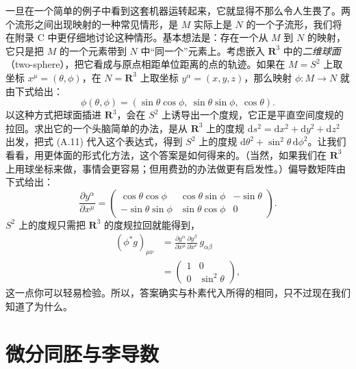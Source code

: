 一旦在一个简单的例子中看到这套机器运转起来，它就显得不那么令人生畏了。两个流形之间出现映射的一种常见情形，是 $M$ 实际上是 $N$ 的一个子流形，我们将在附录 C 中更仔细地讨论这种情形。基本想法是：存在一个从 $M$ 到 $N$ 的映射，它只是把 $M$ 的一个元素带到 $N$ 中“同一个”元素上。考虑嵌入 $\mathbf{R}^{3}$ 中的\emph{二维球面}（two-sphere），把它看成与原点相距单位距离的点的轨迹。如果在 $M = S^{2}$ 上取坐标 $x^{\mu} = (\theta,\phi)$，在 $N = \mathbf{R}^{3}$ 上取坐标 $y^{\alpha} = (x, y, z)$，那么映射 $\phi : M \to N$ 就由下式给出：
\begin{equation*}
\phi(\theta,\phi) = (\sin\theta\cos\phi,\ \sin\theta\sin\phi,\ \cos\theta).
\tag{A.11}
\end{equation*}
以这种方式把球面插进 $\mathbf{R}^{3}$，会在 $S^{2}$ 上诱导出一个度规，它正是平直空间度规的拉回。求出它的一个头脑简单的办法，是从 $\mathbf{R}^{3}$ 上的度规 $\mathrm{d}s^{2} = \mathrm{d}x^{2} + \mathrm{d}y^{2} + \mathrm{d}z^{2}$ 出发，把式 (A.11) 代入这个表达式，得到 $S^{2}$ 上的度规 $\mathrm{d}\theta^{2} + \sin^{2}\theta\,\mathrm{d}\phi^{2}$。让我们看看，用更体面的形式化方法，这个答案是如何得来的。（当然，如果我们在 $\mathbf{R}^{3}$ 上用球坐标来做，事情会更容易；但用费劲的办法做更有启发性。）偏导数矩阵由下式给出：
\begin{equation*}
\frac{\partial y^{\alpha}}{\partial x^{\mu}} =
\begin{pmatrix}
\cos\theta\cos\phi & \cos\theta\sin\phi & -\sin\theta\\
-\sin\theta\sin\phi & \sin\theta\cos\phi & 0
\end{pmatrix}.
\tag{A.12}
\end{equation*}
$S^{2}$ 上的度规只需把 $\mathbf{R}^{3}$ 的度规拉回就能得到，
\begin{align*}
(\phi^{*}g)_{\mu\nu} &= \frac{\partial y^{\alpha}}{\partial x^{\mu}}\frac{\partial y^{\beta}}{\partial x^{\nu}}\,g_{\alpha\beta}\\
 &= \begin{pmatrix} 1 & 0\\ 0 & \sin^{2}\theta \end{pmatrix},
\tag{A.13}
\end{align*}
这一点你可以轻易检验。所以，答案确实与朴素代入所得的相同，只不过现在我们知道了为什么。


\chapter{微分同胚与李导数}

